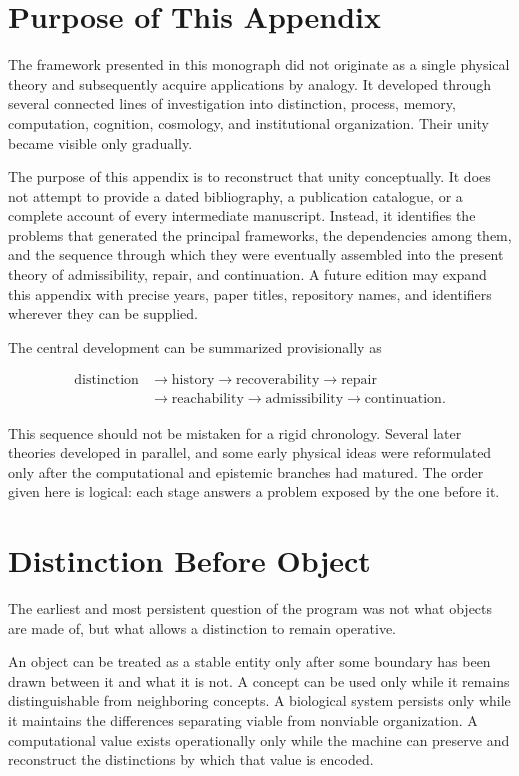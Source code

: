 \documentclass[11pt,oneside]{book}
\numberwithin{equation}{chapter}
\theoremstyle{definition}
\theoremstyle{plain}
\begin{document}
\section{Purpose of This Appendix}

The framework presented in this monograph did not originate as a single
physical theory and subsequently acquire applications by analogy. It
developed through several connected lines of investigation into
distinction, process, memory, computation, cognition, cosmology, and
institutional organization. Their unity became visible only gradually.

The purpose of this appendix is to reconstruct that unity conceptually. It
does not attempt to provide a dated bibliography, a publication catalogue,
or a complete account of every intermediate manuscript. Instead, it
identifies the problems that generated the principal frameworks, the
dependencies among them, and the sequence through which they were
eventually assembled into the present theory of admissibility, repair, and
continuation. A future edition may expand this appendix with precise years,
paper titles, repository names, and identifiers wherever they can be
supplied.

The central development can be summarized provisionally as

\[
\boxed{
\begin{aligned}
\text{distinction}
&\longrightarrow
\text{history}
\longrightarrow
\text{recoverability}
\longrightarrow
\text{repair}
\\
&\longrightarrow
\text{reachability}
\longrightarrow
\text{admissibility}
\longrightarrow
\text{continuation}.
\end{aligned}
}
\]

This sequence should not be mistaken for a rigid chronology. Several later
theories developed in parallel, and some early physical ideas were
reformulated only after the computational and epistemic branches had
matured. The order given here is logical: each stage answers a problem
exposed by the one before it.

\section{Distinction Before Object}

The earliest and most persistent question of the program was not what
objects are made of, but what allows a distinction to remain operative.

An object can be treated as a stable entity only after some boundary has
been drawn between it and what it is not. A concept can be used only while
it remains distinguishable from neighboring concepts. A biological system
persists only while it maintains the differences separating viable from
nonviable organization. A computational value exists operationally only
while the machine can preserve and reconstruct the distinctions by which
that value is encoded.
\end{document}
